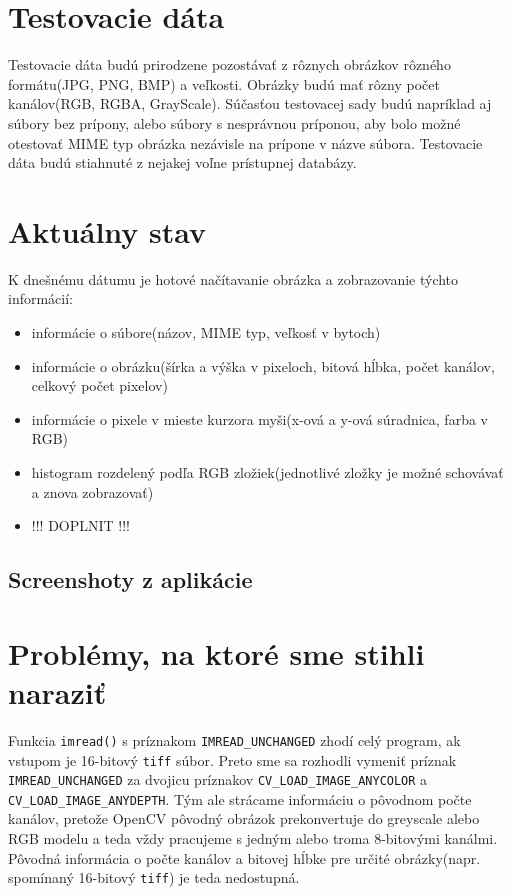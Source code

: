 \documentclass[12pt,a4paper,titlepage,final]{article}
\begin{document}
\section{Testovacie dáta}
Testovacie dáta budú prirodzene pozostávať z rôznych obrázkov rôzného formátu(JPG, PNG, BMP) a veľkosti. Obrázky budú mať rôzny počet kanálov(RGB, RGBA, GrayScale). Súčasťou testovacej sady budú napríklad aj súbory bez prípony, alebo súbory s nesprávnou príponou, aby bolo možné otestovať MIME typ obrázka nezávisle na prípone v názve súbora.
Testovacie dáta budú stiahnuté z nejakej voľne prístupnej databázy.

\section{Aktuálny stav}
K dnešnému dátumu je hotové načítavanie obrázka a zobrazovanie týchto informácií:
\begin{itemize}
	\item informácie o súbore(názov, MIME typ, veľkosť v bytoch)
	\item informácie o obrázku(šírka a výška v pixeloch, bitová hĺbka, počet kanálov, celkový počet pixelov)
	\item informácie o pixele v mieste kurzora myši(x-ová a y-ová súradnica, farba v RGB)
	\item histogram rozdelený podľa RGB zložiek(jednotlivé zložky je možné schovávať a znova zobrazovať)
	\item !!! DOPLNIT !!!
\end{itemize}
\subsection{Screenshoty z aplikácie}

\section{Problémy, na ktoré sme stihli naraziť}
Funkcia \verb|imread()| s príznakom \verb|IMREAD_UNCHANGED| zhodí celý program, ak vstupom je 16-bitový \verb|tiff| súbor. Preto sme sa rozhodli vymeniť príznak \verb|IMREAD_UNCHANGED| za dvojicu príznakov \verb|CV_LOAD_IMAGE_ANYCOLOR| a \verb|CV_LOAD_IMAGE_ANYDEPTH|. Tým ale strácame informáciu o pôvodnom počte kanálov, pretože OpenCV pôvodný obrázok prekonvertuje do greyscale alebo RGB modelu a teda vždy pracujeme s jedným alebo troma 8-bitovými kanálmi. Pôvodná informácia o počte kanálov a bitovej hĺbke pre určité obrázky(napr. spomínaný 16-bitový \verb|tiff|) je teda nedostupná.
\end{document}
